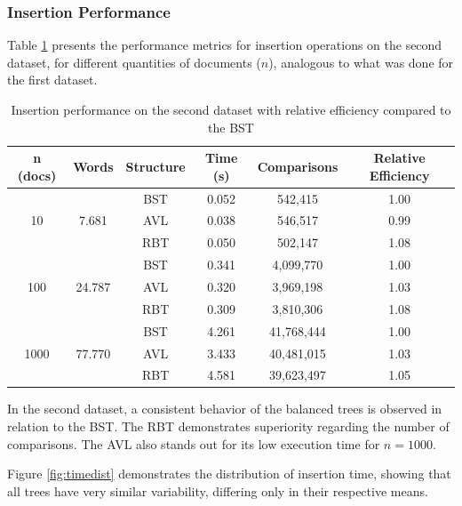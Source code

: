  \subsubsection{Insertion Performance}

 Table \ref{tab:insercao_db2} presents the performance metrics for insertion operations on the second dataset,
 for different quantities of documents ($n$), analogous to what was done for the first dataset.

 \begin{table}[H]
     \centering
     \begin{tabular}{|c|c|c|c|c|c|}
     \hline
     \textbf{n (docs)} & \textbf{Words} & \textbf{Structure} & \textbf{Time (s)} & \textbf{Comparisons} & \textbf{Relative Efficiency} \\
     \hline
     \multirow{3}{*}{10} & \multirow{3}{*}{7.681} & BST & 0.052 & 542,415 & 1.00 \\
     & & AVL & 0.038 & 546,517 & 0.99 \\
     & & RBT & 0.050 & 502,147 & 1.08 \\
     \hline
     \multirow{3}{*}{100} & \multirow{3}{*}{24.787} & BST & 0.341 & 4,099,770 & 1.00 \\
     & & AVL & 0.320 & 3,969,198 & 1.03 \\
     & & RBT & 0.309 & 3,810,306 & 1.08 \\
     \hline
     \multirow{3}{*}{1000} & \multirow{3}{*}{77.770} & BST & 4.261 & 41,768,444 & 1.00 \\
     & & AVL & 3.433 & 40,481,015 & 1.03 \\
     & & RBT & 4.581 & 39,623,497 & 1.05 \\
     \hline
     \end{tabular}
     \caption{Insertion performance on the second dataset with relative efficiency compared to the BST}
     \label{tab:insercao_db2}
 \end{table}


 In the second dataset, a consistent behavior of the balanced trees is observed in relation to the BST.
 The RBT demonstrates superiority regarding the number of comparisons. The AVL also stands out for its low execution
 time for $n = 1000$.

 Figure \ref{fig:timedist} demonstrates the distribution of insertion time, showing that all trees 
 have very similar variability, differing only in their respective means.

